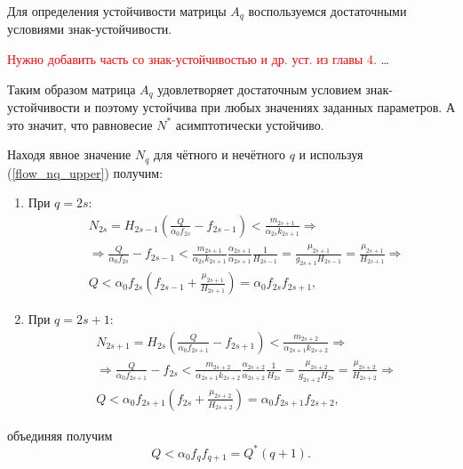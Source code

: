         Для определения устойчивости матрицы \(A_q\) воспользуемся достаточными условиями знак-устойчивости. 
        
        \textcolor{red}{Нужно добавить часть со знак-устойчивостью и др. уст. из главы 4.} \dots

        Таким образом матрица \(A_q\) удовлетворяет достаточным условием знак-устойчивости и поэтому устойчива при любых значениях заданных параметров. А это значит, что равновесие \(N^*\) асимптотически устойчиво.

        Находя явное значение \(N_q\) для чётного и нечётного \(q\) и используя (\ref{flow_nq_upper}) получим:
        \begin{enumerate}
            \item При \(q = 2s\):
            \begin{equation}
                \begin{split}
                    & N_{2s} = H_{2s-1} \left( \frac{Q}{\alpha_0 f_{2s}} - f_{2s-1} \right) < \frac{m_{2s+1}}{\alpha_{2s} k_{2s+1}} \Rightarrow \\
                    & \Rightarrow \frac{Q}{\alpha_0 f_{2s}} - f_{2s-1} < \frac{m_{2s+1}}{\alpha_{2s} k_{2s+1}} \frac{\alpha_{2s+1}}{\alpha_{2s+1}} \frac{1}{H_{2s-1}} = \frac{\mu_{2s+1}}{g_{2s+1} H_{2s-1}} = \frac{\mu_{2s+1}}{H_{2s+1}} \Rightarrow \\
                    & Q < \alpha_0 f_{2s} \left(  f_{2s-1} + \frac{\mu_{2s+1}}{H_{2s+1}} \right) = \alpha_0 f_{2s} f_{2s+1},        
                \end{split}
            \end{equation}
            
            \item При \(q = 2s+1\):
            \begin{equation}
                \begin{split}
                    & N_{2s+1} = H_{2s} \left( \frac{Q}{\alpha_0 f_{2s+1}} - f_{2s+1} \right) < \frac{m_{2s+2}}{\alpha_{2s+1} k_{2s+2}} \Rightarrow \\
                    & \Rightarrow \frac{Q}{\alpha_0 f_{2s+1}} - f_{2s} < \frac{m_{2s+2}}{\alpha_{2s+1} k_{2s+2}} \frac{\alpha_{2s+2}}{\alpha_{2s+2}} \frac{1}{H_{2s}} = \frac{\mu_{2s+2}}{g_{2s+2} H_{2s}} = \frac{\mu_{2s+2}}{H_{2s+2}} \Rightarrow \\
                    & Q < \alpha_0 f_{2s+1} \left(  f_{2s} + \frac{\mu_{2s+2}}{H_{2s+2}} \right) = \alpha_0 f_{2s+1} f_{2s+2},      
                \end{split}
            \end{equation}
        \end{enumerate}
        объединяя получим
        \begin{equation}
            Q < \alpha_0 f_{q} f_{q+1} = Q^*(q+1).
        \end{equation}

